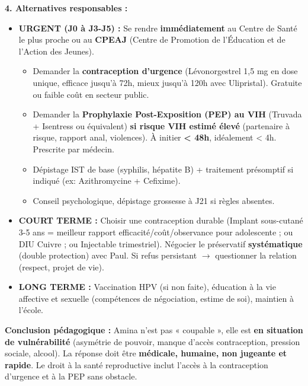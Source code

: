 \documentclass[11pt]{article}
\begin{document}
\begin{exoresolu}
\textbf{4. Alternatives responsables :}
\begin{itemize}
    \item \textbf{URGENT (J0 à J3-J5) :} Se rendre \textbf{immédiatement} au Centre de Santé le plus proche ou au \textbf{CPEAJ} (Centre de Promotion de l'Éducation et de l'Action des Jeunes).
    \begin{itemize}
        \item Demander la \textbf{contraception d'urgence} (Lévonorgestrel 1,5 mg en dose unique, efficace jusqu'à 72h, mieux jusqu'à 120h avec Ulipristal). Gratuite ou faible coût en secteur public.
        \item Demander la \textbf{Prophylaxie Post-Exposition (PEP) au VIH} (Truvada + Isentress ou équivalent) \textbf{si risque VIH estimé élevé} (partenaire à risque, rapport anal, violences). À initier \textbf{< 48h}, idéalement < 4h. Prescrite par médecin.
        \item Dépistage IST de base (syphilis, hépatite B) + traitement présomptif si indiqué (ex: Azithromycine + Cefixime).
        \item Conseil psychologique, dépistage grossesse à J21 si règles absentes.
    \end{itemize}
    \item \textbf{COURT TERME :} Choisir une contraception durable (Implant sous-cutané 3-5 ans = meilleur rapport efficacité/coût/observance pour adolescente ; ou DIU Cuivre ; ou Injectable trimestriel). Négocier le préservatif \textbf{systématique} (double protection) avec Paul. Si refus persistant $\rightarrow$ questionner la relation (respect, projet de vie).
    \item \textbf{LONG TERME :} Vaccination HPV (si non faite), éducation à la vie affective et sexuelle (compétences de négociation, estime de soi), maintien à l'école.
\end{itemize}

\textbf{Conclusion pédagogique :} Amina n'est pas « coupable », elle est \textbf{en situation de vulnérabilité} (asymétrie de pouvoir, manque d'accès contraception, pression sociale, alcool). La réponse doit être \textbf{médicale, humaine, non jugeante et rapide}. Le droit à la santé reproductive inclut l'accès à la contraception d'urgence et à la PEP sans obstacle.
\end{exoresolu}
\end{document}
